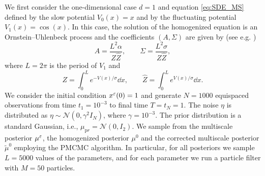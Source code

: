 \documentclass[10pt]{article}
\begin{document}
We first consider the one-dimensional case $d = 1$ and equation \eqref{eq:SDE_MS} defined by the slow potential $V_0(x) = x$ and by the fluctuating potential $V_1(x) = \cos(x)$. In this case, the solution of the homogenized equation is an Ornstein--Uhlenbeck process and the coefficients $(A, \Sigma)$ are given by (see e.g. \cite{PaS07})
\begin{equation}
	A = \frac{L^2 \alpha}{Z \widehat Z}, \qquad \Sigma = \frac{L^2 \sigma}{Z \widehat Z},
\end{equation}
where $L = 2\pi$ is the period of $V_1$ and 
\begin{equation}
	Z = \int_0^L e^{-V(x)/\sigma} \dd x, \qquad \widehat Z = \int_0^L e^{V(x)/\sigma} \dd x.
\end{equation}
We consider the initial condition $x^\varepsilon(0) = 1$ and generate $N = 1000$ equispaced observations from time $t_1 = 10^{-3}$ to final time $T = t_N = 1$. The noise $\eta$ is distributed as $\eta \sim \mathcal N(0, \gamma^2 I_N)$, where $\gamma = 10^{-3}$. The prior distribution is a standard Gaussian, i.e., $\mu_{\mathrm pr} = \mathcal N(0, I_2)$. We sample from the multiscale posterior $\mu^\varepsilon$, the homogenized posterior $\mu^0$ and the corrected multiscale posterior $\tilde \mu^0$ employing the PMCMC algorithm. In particular, for all posteriors we sample $L = 5000$ values of the parameters, and for each parameter we run a particle filter with $M = 50$ particles.






\end{document}
